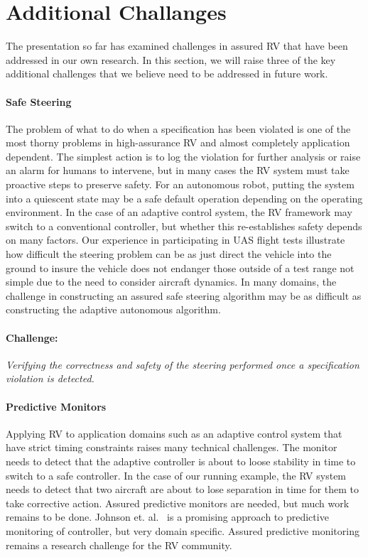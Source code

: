 \section{Additional Challanges }\label{sec:future} 
The presentation so far has examined challenges in assured RV that
have been addressed in our own research. In this section, we will
raise three of the key additional challenges that we believe need to
be addressed in future work.

\paragraph{Safe Steering} The problem of what to do when a
specification has been violated is one of the most thorny problems in
high-assurance RV and almost completely application dependent. The
simplest action is to log the violation for further analysis or raise
an alarm for humans to intervene, but in many cases the RV system must
take proactive steps to preserve safety. For an autonomous robot,
putting the system into a quiescent state may be a safe default
operation depending on the operating environment.  In the case of an
adaptive control system, the RV framework may switch to a conventional
controller, but whether this re-establishes safety depends on many
factors.  Our experience in participating in UAS flight tests
illustrate how difficult the steering problem can be as just direct
the vehicle into the ground to insure the vehicle does not endanger
those outside of a test range not simple due to the need to consider
aircraft dynamics.  In many domains, the challenge in constructing an
assured safe steering algorithm may be as difficult as constructing
the adaptive autonomous algorithm.

\paragraph{Challenge:}  \emph{Verifying the correctness and safety of the
steering performed once a specification violation is detected.}
 


\paragraph{Predictive Monitors} Applying RV to application domains
such as an adaptive control system that have strict timing constraints
raises many technical challenges. The monitor needs to detect that the
adaptive controller is about to loose stability in time to switch to a
safe controller. In the case of our running example, the RV system
needs to detect that two aircraft are about to lose separation in time
for them to take corrective action.  Assured predictive monitors are
needed, but much work remains to be done.  Johnson
et. al.~\cite{johnson2015tecs} is a promising approach to predictive
monitoring of controller, but very domain specific. Assured predictive
monitoring remains a research challenge for the RV community.

